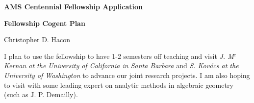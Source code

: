 \documentclass[12pt]{amsart}
\begin{document}
\begin{center}
{\Large \textbf{AMS Centennial Fellowship Application}}

\vspace{10pt}

{\Large \textbf{Fellowship Cogent Plan}}

\vspace{10pt}

{Christopher D. Hacon}
\end{center}

\vspace{16pt}

I plan to use the fellowship to have 1-2 semesters off teaching and 
visit \emph{J. M$^c$Kernan at the University of California in Santa Barbara} 
and \emph{S. Kov\'acs
at the University of Washington}
to advance our joint research projects. I am also hoping to visit with some leading expert on analytic methods in algebraic geometry (such as J. P. Demailly).
\end{document}
